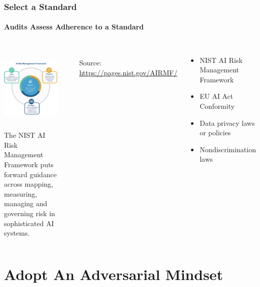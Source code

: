 \documentclass[11pt,
               aspectratio=169,
               hyperref={colorlinks}
               ]{beamer}
\begin{document}
			\begin{frame}
				
				\frametitle{Select a Standard}
				\framesubtitle{Audits Assess Adherence to a Standard}		
				
				\begin{columns}
					\centering
					\includegraphics[height=120pt]{../img/NIST_RMF_img1.png}\\
					\scriptsize{The NIST AI Risk Management Framework puts forward guidance across mapping, measuring, managing and governing risk in sophisticated AI systems.}
					
					\par\noindent\rule{100pt}{0.4pt}\\
					\vspace{5pt}
					\scriptsize{\tiny{Source: \url{https://pages.nist.gov/AIRMF/}}}
					
					\vspace{-5pt}
					\begin{itemize}
						\item NIST AI Risk Management Framework
						\item EU AI Act Conformity
						\item Data privacy laws or policies
						\item Nondiscrimination laws
					\end{itemize}
				\end{columns}

			\end{frame}


	\section{Adopt An Adversarial Mindset}
\end{document}
